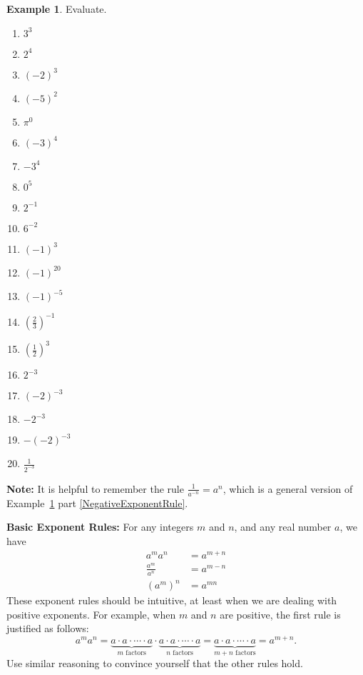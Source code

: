 \documentclass[letterpaper,12pt,oneside]{book}
\theoremstyle{definition}
\newtheorem{example}[theorem]{Example}
\begin{document}
\begin{example}\label{ExponentEvaluations} Evaluate.
\begin{multicols}{3}
\begin{enumerate}
\item $3^3$
\item $2^4$
\item $(-2)^3$
\item $(-5)^2$
\item $\pi^0$
\item $(-3)^4$
\item $-3^4$
\item $0^5$
\item $2^{-1}$
\item $6^{-2}$
\item $(-1)^3$
\item $(-1)^{20}$
\item $(-1)^{-5}$
\item $\left(\frac{2}{3}\right)^{-1}$
\item $\left(\frac{1}{2}\right)^3$
\item $2^{-3}$
\item $(-2)^{-3}$
\item $-2^{-3}$
\item $-(-2)^{-3}$
\item $\frac{1}{2^{-3}}$\label{NegativeExponentRule}
\end{enumerate}
\end{multicols}
\end{example}

\noindent
\textbf{Note:} It is helpful to remember the rule $\frac{1}{a^{-n}}=a^n$, which is a general version of Example~\ref{ExponentEvaluations} part \ref{NegativeExponentRule}.

\smallskip 
\noindent
\textbf{Basic Exponent Rules:} For any integers $m$ and $n$, and any real number $a$, we have
\begin{align*}
a^ma^n&=a^{m+n}\\
\frac{a^m}{a^n}&=a^{m-n}\\
(a^m)^n&=a^{mn}
\end{align*}
These exponent rules should be intuitive, at least when we are dealing with positive exponents.  For example, when $m$ and $n$ are positive, the first rule is justified as follows:
\[
a^m a^n=\underbrace{a\cdot a\cdot \cdots \cdot a}_{m\text{ factors}} \cdot \underbrace{a\cdot a\cdot \cdots \cdot a}_{n\text{ factors}}=\underbrace{a\cdot a\cdot \cdots \cdot a}_{m+n\text{ factors}}=a^{m+n}.
\]
Use similar reasoning to convince yourself that the other rules hold.
\end{document}

